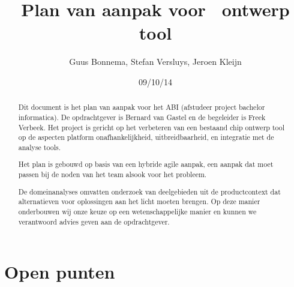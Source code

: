 \documentclass[a4paper,11pt]{article}
\author{Guus Bonnema, Stefan Versluys, Jeroen Kleijn}
\date{09/10/14}
\title{Plan van aanpak voor \xmas\ ontwerp tool}
\begin{document}

\newcommand{\xmas}{x\textsc{mas}}%

\newcommand\secformat[1]{%
    {\fontsize{60}{60}\selectfont\thesection}%
    \quad\rule[-8pt]{2pt}{40pt}\quad
    \parbox[b]{.7\textwidth}{\filright\bfseries #1}}%
\titleformat{\section}[block]
    {\filright\normalfont\sffamily}{}{0pt}{\secformat}
[1pc]


\maketitle

\listoftodos

\begin{abstract}
 Dit document is het plan van aanpak voor het ABI (afstudeer project bachelor
 informatica). De opdrachtgever is Bernard van Gastel en de begeleider is
 Freek Verbeek. Het project is gericht op het verbeteren van een bestaand
 chip ontwerp tool op de aspecten platform onafhankelijkheid, uitbreidbaarheid,
 en integratie met de analyse tools.

 Het plan is gebouwd op basis van een hybride agile aanpak, een aanpak dat
 moet passen bij de noden van het team alsook voor het probleem.

 De domeinanalyses omvatten onderzoek van deelgebieden uit de productcontext
 dat alternatieven voor oplossingen aan het licht moeten brengen.
 Op deze manier onderbouwen wij onze keuze op een wetenschappelijke manier
 en kunnen we verantwoord advies geven aan de opdrachtgever.

\end{abstract}

\section{Open punten}
\end{document}
